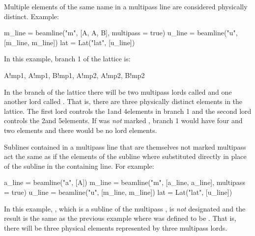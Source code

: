 Multiple elements of the same name in a multipass line are considered 
physically distinct. Example:
\begin{example}
  m_line = beamline("m", [A, A, B], multipass = true)
  u_line = beamline("u", [m_line, m_line])
  lat = Lat("lat", [u_line])
\end{example}
In this example, branch 1 of the lattice is:
\begin{example}
  A!mp1, A!mp1, B!mp1, A!mp2, A!mp2, B!mp2
\end{example}
In the  branch of the lattice there will be two multipass lords called  and 
one another lord called . 
That is, there are three physically distinct elements in the lattice. The first
 lord controls the 1\St and 4\Th elements in branch 1 and the second
 lord controls the 2\Nd and 5\Th elements. If  was {\em not} marked ,
branch 1 would have four  and two  elements and there would be
no lord elements.

Sublines contained in a multipass line that are themselves not marked multipass act the same as if
the elements of the subline where substituted directly in place of the subline in the containing
line. For example:
\begin{example}
  a_line = beamline("a", [A])
  m_line = beamline("m", [a_line, a_line], multipass = true)
  u_line = beamline("u", [m_line, m_line])
  lat = Lat("lat", [u_line])
\end{example}
In this example, , which is a subline of the multipass , is {\em not}
designated  and the result is the same as the previous example where  was
defined to be . That is, there will be three physical elements represented by three
multipass lords.

